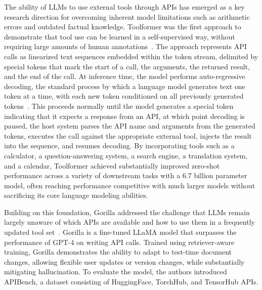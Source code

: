 \documentclass[
english,                 %
bibtex,                  %
]{kththesis}
\numberwithin{listing}{chapter}
\begin{document}
The ability of \glspl{LLM} to use external tools through \glspl{API} has emerged as a key research direction for overcoming inherent model limitations such as arithmetic errors and outdated factual knowledge. Toolformer was the first approach to demonstrate that tool use can be learned in a self-supervised way, without requiring large amounts of human annotations~\cite{schick_toolformer_2023}. The approach represents \gls{API} calls as linearized text sequences embedded within the token stream, delimited by special tokens that mark the start of a call, the arguments, the returned result, and the end of the call. At inference time, the model performs auto-regressive decoding, the standard process by which a language model generates text one token at a time, with each new token conditioned on all previously generated tokens~\cite{zhong_extractive_2020}. This proceeds normally until the model generates a special token indicating that it expects a response from an \gls{API}, at which point decoding is paused, the host system parses the \gls{API} name and arguments from the generated tokens, executes the call against the appropriate external tool, injects the result into the sequence, and resumes decoding. By incorporating tools such as a calculator, a question-answering system, a search engine, a translation system, and a calendar, Toolformer achieved substantially improved zero-shot performance across a variety of downstream tasks with a 6.7 billion parameter model, often reaching performance competitive with much larger models without sacrificing its core language modeling abilities.

Building on this foundation, Gorilla addressed the challenge that \glspl{LLM} remain largely unaware of which \glspl{API} are available and how to use them in a frequently updated tool set~\cite{gonzalez_gorilla_2024}. Gorilla is a fine-tuned \gls{LLaMA} model that surpasses the performance of \gls{GPT}-4 on writing \gls{API} calls. Trained using retriever-aware training, Gorilla demonstrates the ability to adapt to test-time document changes, allowing flexible user updates or version changes, while substantially mitigating hallucination. To evaluate the model, the authors introduced \gls{API}Bench, a dataset consisting of HuggingFace, TorchHub, and TensorHub \glspl{API}.
\end{document}
